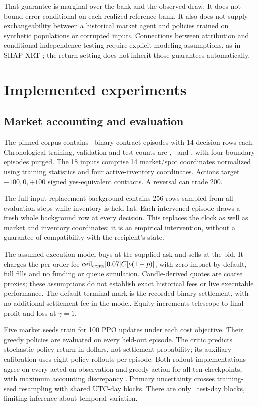 \documentclass[10pt,twocolumn]{article}
\begin{document}
That guarantee is marginal over the bank and the observed draw. It does not
bound error conditional on each realized reference bank. It also does not
supply exchangeability between a historical market agent and policies trained
on synthetic populations or corrupted inputs. Connections between attribution
and conditional-independence testing require explicit modeling assumptions,
as in SHAP-XRT \citep{teneggi2023}; the return setting does not inherit those
guarantees automatically.

\section{Implemented experiments}
\subsection{Market accounting and evaluation}
The pinned corpus contains \EpisodeCount\ binary-contract episodes with 14
decision rows each. Chronological training, validation and test counts are
\TrainCount, \ValidationCount\ and \TestCount, with four boundary episodes
purged. The 18 inputs comprise 14 market/spot coordinates normalized using
training statistics and four active-inventory coordinates. Actions target
$-100,0,+100$ signed yes-equivalent contracts. A reversal can trade 200.

The full-input replacement background contains 256 rows sampled from all
evaluation steps while inventory is held flat. Each intervened episode draws
a fresh whole background row at every decision. This replaces the clock as
well as market and inventory coordinates; it is an empirical intervention,
without a guarantee of compatibility with the recipient's state.

The assumed execution model buys at the supplied ask and sells at the bid.
It charges the per-order fee
$\operatorname{ceil}_{\rm cents}[0.07|C|p(1-p)]$, with zero impact by default,
full fills and no funding or queue simulation. Candle-derived quotes are
coarse proxies; these assumptions do not establish exact historical fees or
live executable performance. The default terminal mark is the recorded binary
settlement, with no additional settlement fee in the model. Equity increments
telescope to final profit and loss at $\gamma=1$.

Five market seeds train for 100 PPO updates under each cost objective. Their
greedy policies are evaluated on every held-out episode. The critic predicts
stochastic policy return in dollars, not settlement probability; its auxiliary
calibration uses eight policy rollouts per episode. Both rollout implementations
agree on every acted-on observation and greedy action for all ten checkpoints,
with maximum accounting discrepancy \ParityError. Primary uncertainty crosses
training-seed resampling with shared UTC-day blocks. There are only
\DayCount\ test-day blocks, limiting inference about temporal variation.
\end{document}
